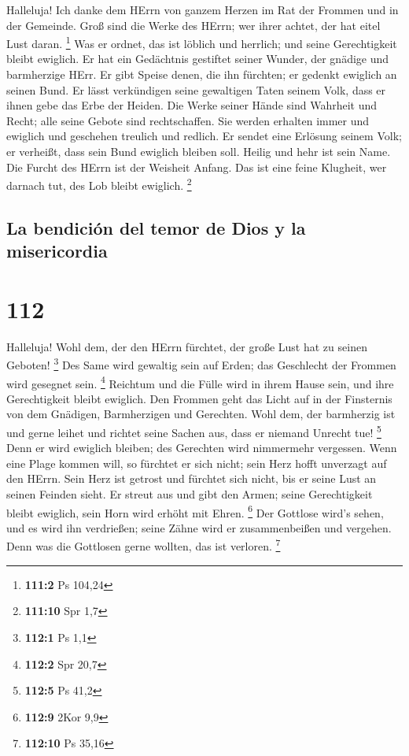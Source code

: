  Halleluja! Ich danke dem HErrn von ganzem Herzen im Rat
der Frommen und in der Gemeinde.  Groß sind die Werke des
HErrn; wer ihrer achtet, der hat eitel Lust daran. \footnote{\textbf{111:2}
  Ps 104,24}  Was er ordnet, das ist löblich und herrlich;
und seine Gerechtigkeit bleibt ewiglich.  Er hat ein
Gedächtnis gestiftet seiner Wunder, der gnädige und barmherzige HErr.
 Er gibt Speise denen, die ihn fürchten; er gedenkt
ewiglich an seinen Bund.  Er lässt verkündigen seine
gewaltigen Taten seinem Volk, dass er ihnen gebe das Erbe der Heiden.
 Die Werke seiner Hände sind Wahrheit und Recht; alle
seine Gebote sind rechtschaffen.  Sie werden erhalten
immer und ewiglich und geschehen treulich und redlich.  Er
sendet eine Erlösung seinem Volk; er verheißt, dass sein Bund ewiglich
bleiben soll. Heilig und hehr ist sein Name.  Die Furcht
des HErrn ist der Weisheit Anfang. Das ist eine feine Klugheit, wer
darnach tut, des Lob bleibt ewiglich. \footnote{\textbf{111:10} Spr 1,7}

\hypertarget{la-bendiciuxf3n-del-temor-de-dios-y-la-misericordia}{%
\subsection{La bendición del temor de Dios y la
misericordia}\label{la-bendiciuxf3n-del-temor-de-dios-y-la-misericordia}}

\hypertarget{section-111}{%
\section{112}\label{section-111}}

 Halleluja! Wohl dem, der den HErrn fürchtet, der große
Lust hat zu seinen Geboten! \footnote{\textbf{112:1} Ps 1,1}
 Des Same wird gewaltig sein auf Erden; das Geschlecht der
Frommen wird gesegnet sein. \footnote{\textbf{112:2} Spr 20,7}
 Reichtum und die Fülle wird in ihrem Hause sein, und ihre
Gerechtigkeit bleibt ewiglich.  Den Frommen geht das Licht
auf in der Finsternis von dem Gnädigen, Barmherzigen und Gerechten.
 Wohl dem, der barmherzig ist und gerne leihet und richtet
seine Sachen aus, dass er niemand Unrecht tue! \footnote{\textbf{112:5}
  Ps 41,2}  Denn er wird ewiglich bleiben; des Gerechten
wird nimmermehr vergessen.  Wenn eine Plage kommen will,
so fürchtet er sich nicht; sein Herz hofft unverzagt auf den HErrn.
 Sein Herz ist getrost und fürchtet sich nicht, bis er
seine Lust an seinen Feinden sieht.  Er streut aus und
gibt den Armen; seine Gerechtigkeit bleibt ewiglich, sein Horn wird
erhöht mit Ehren. \footnote{\textbf{112:9} 2Kor 9,9}  Der
Gottlose wird's sehen, und es wird ihn verdrießen; seine Zähne wird er
zusammenbeißen und vergehen. Denn was die Gottlosen gerne wollten, das
ist verloren. \footnote{\textbf{112:10} Ps 35,16}

